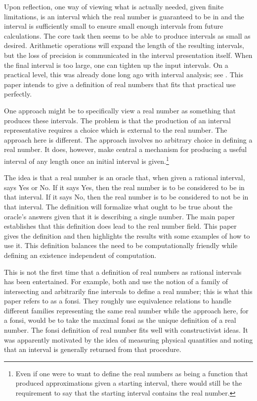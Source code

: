 \documentclass[12pt]{article}
\begin{document}
Upon reflection, one way of viewing what is actually needed, given finite limitations, is an interval which the real number is guaranteed to be in and the interval is sufficiently small to ensure small enough intervals from future calculations.  The core task then seems to be able to produce intervals as small as desired. Arithmetic operations will expand the length of the resulting intervals, but the loss of precision is communicated in the interval presentation itself. When the final interval is too large, one can tighten up the input intervals. On a practical level, this was already done long ago with interval analysis; see \cite{moore}. This paper intends to give a definition of real numbers that fits that practical use perfectly. 

One approach might be to specifically view a real number as something that produces these intervals. The problem is that the production of an interval representative requires a choice which is external to the real number. The approach here is different. The approach involves no arbitrary choice in defining a real number. It does, however, make central a mechanism for producing a useful interval of any length once an initial interval is given.\footnote{Even if one were to want to define the real numbers as being a function that produced approximations given a starting interval, there would still be the requirement to say that the starting interval contains the real number.}

The idea is that a real number is an oracle that, when given a rational interval, says Yes or No. If it says Yes, then the real number is to be considered to be in that interval. If it says No, then the real number is to be considered to not be in that interval. The definition will formalize what ought to be true about the oracle's answers given that it is describing a single number. The main paper establishes that this definition does lead to the real number field. This paper gives the definition and then highlights the results with some examples of how to use it. This definition balances the need to be computationally friendly while defining an existence independent of computation. 

This is not the first time that a definition of real numbers as rational intervals has been entertained. For example, both \cite{bridger} and \cite{bridges} use the notion of a family of intersecting and arbitrarily fine intervals to define a real number; this is what this paper refers to as a fonsi. They roughly use equivalence relations to handle different families representing the same real number while the approach here, for a fonsi, would be to take the maximal fonsi as the unique definition of a real number. The fonsi definition of real number fits well with constructivist ideas. It was apparently motivated by the idea of measuring physical quantities and noting that an interval is generally returned from that procedure. 
\end{document}
